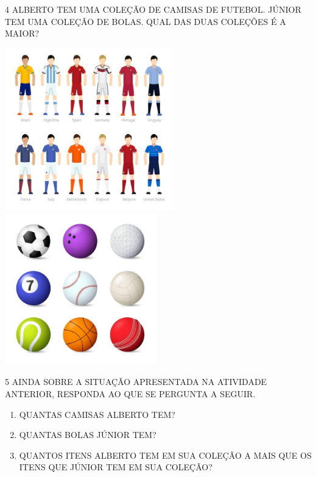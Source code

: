 \num{4} ALBERTO TEM UMA COLEÇÃO DE CAMISAS DE FUTEBOL. JÚNIOR TEM UMA COLEÇÃO DE BOLAS. QUAL DAS DUAS COLEÇÕES É A MAIOR?


\includegraphics[width=2.90024in,height=2.77508in]{media/image5.jpg}
\includegraphics[width=2.59375in,height=2.59375in]{media/image6.jpg}


\num{5} AINDA SOBRE A SITUAÇÃO APRESENTADA NA ATIVIDADE ANTERIOR, RESPONDA AO QUE SE PERGUNTA A SEGUIR.

\begin{enumerate}
\item
  QUANTAS CAMISAS ALBERTO TEM? 

\item
  QUANTAS BOLAS JÚNIOR TEM? 

\item
  QUANTOS ITENS ALBERTO TEM EM SUA COLEÇÃO A MAIS QUE OS ITENS QUE JÚNIOR TEM EM SUA COLEÇÃO?

\end{enumerate}

